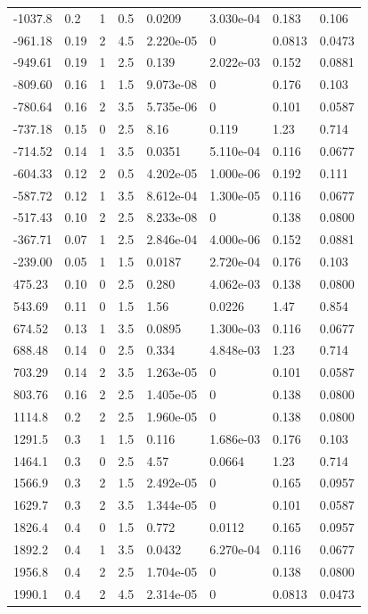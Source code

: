 \documentclass[preview]{standalone}
\begin{document}
{{\begin{tabular}{L{1.2cm}C{1.2cm} C{0.3cm}C{0.5cm} C{1.4cm}C{1.4cm} C{1.4cm}C{1.4cm}}
  -1037.8  &   0.2  & 1     & 0.5 &  0.0209  & 3.030e-04  & 0.183 &  0.106   \\ 
  -961.18  &  0.19  & 2     & 4.5 &  2.220e-05  & 0  & 0.0813 &  0.0473   \\ 
  -949.61  &  0.19  & 1     & 2.5 &  0.139  & 2.022e-03  & 0.152 &  0.0881   \\ 
  -809.60  &  0.16  & 1     & 1.5 &  9.073e-08  & 0  & 0.176 &  0.103   \\ 
  -780.64  &  0.16  & 2     & 3.5 &  5.735e-06  & 0  & 0.101 &  0.0587   \\ 
  -737.18  &  0.15  & 0     & 2.5 &  8.16  & 0.119  & 1.23 &  0.714   \\ 
  -714.52  &  0.14  & 1     & 3.5 &  0.0351  & 5.110e-04  & 0.116 &  0.0677   \\ 
  -604.33  &  0.12  & 2     & 0.5 &  4.202e-05  & 1.000e-06  & 0.192 &  0.111   \\ 
  -587.72  &  0.12  & 1     & 3.5 &  8.612e-04  & 1.300e-05  & 0.116 &  0.0677   \\ 
  -517.43  &  0.10  & 2     & 2.5 &  8.233e-08  & 0  & 0.138 &  0.0800   \\ 
  -367.71  &  0.07  & 1     & 2.5 &  2.846e-04  & 4.000e-06  & 0.152 &  0.0881   \\ 
  -239.00  &  0.05  & 1     & 1.5 &  0.0187  & 2.720e-04  & 0.176 &  0.103   \\ 
  475.23  &  0.10  & 0     & 2.5 &  0.280  & 4.062e-03  & 0.138 &  0.0800   \\ 
  543.69  &  0.11  & 0     & 1.5 &  1.56  & 0.0226  & 1.47 &  0.854   \\ 
  674.52  &  0.13  & 1     & 3.5 &  0.0895  & 1.300e-03  & 0.116 &  0.0677   \\ 
  688.48  &  0.14  & 0     & 2.5 &  0.334  & 4.848e-03  & 1.23 &  0.714   \\ 
  703.29  &  0.14  & 2     & 3.5 &  1.263e-05  & 0  & 0.101 &  0.0587   \\ 
  803.76  &  0.16  & 2     & 2.5 &  1.405e-05  & 0  & 0.138 &  0.0800   \\ 
  1114.8  &   0.2  & 2     & 2.5 &  1.960e-05  & 0  & 0.138 &  0.0800   \\ 
  1291.5  &   0.3  & 1     & 1.5 &  0.116  & 1.686e-03  & 0.176 &  0.103   \\ 
  1464.1  &   0.3  & 0     & 2.5 &  4.57  & 0.0664  & 1.23 &  0.714   \\ 
  1566.9  &   0.3  & 2     & 1.5 &  2.492e-05  & 0  & 0.165 &  0.0957   \\ 
  1629.7  &   0.3  & 2     & 3.5 &  1.344e-05  & 0  & 0.101 &  0.0587   \\ 
  1826.4  &   0.4  & 0     & 1.5 &  0.772  & 0.0112  & 0.165 &  0.0957   \\ 
  1892.2  &   0.4  & 1     & 3.5 &  0.0432  & 6.270e-04  & 0.116 &  0.0677   \\ 
  1956.8  &   0.4  & 2     & 2.5 &  1.704e-05  & 0  & 0.138 &  0.0800   \\ 
  1990.1  &   0.4  & 2     & 4.5 &  2.314e-05  & 0  & 0.0813 &  0.0473   \\ 
\hline 
\end{tabular} 

}}
\end{document}
